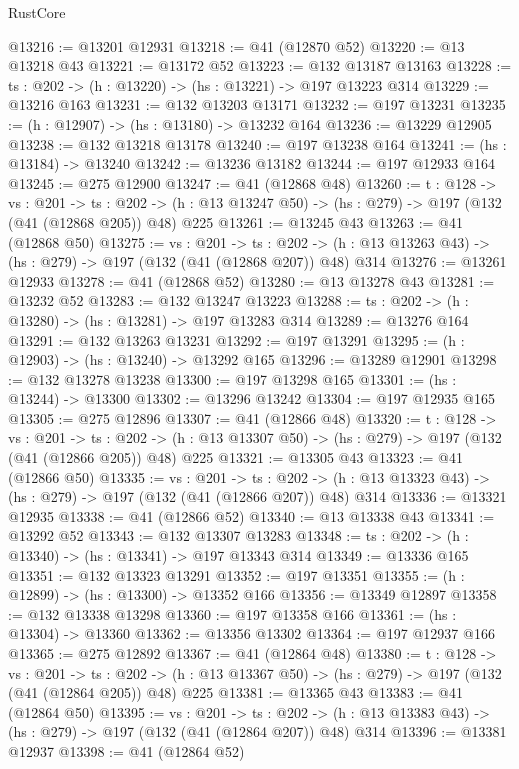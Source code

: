 \begin{lexlean}{RustCore}
\begin{coremodule}
@13216 := @13201 @12931
@13218 := @41 (@12870 @52)
@13220 := @13 @13218 @43
@13221 := @13172 @52
@13223 := @132 @13187 @13163
@13228 := {ts : @202} -> (h : @13220) -> (hs : @13221) -> @197 @13223 @314
@13229 := @13216 @163
@13231 := @132 @13203 @13171
@13232 := @197 @13231
@13235 := (h : @12907) -> (hs : @13180) -> @13232 @164
@13236 := @13229 @12905
@13238 := @132 @13218 @13178
@13240 := @197 @13238 @164
@13241 := (hs : @13184) -> @13240
@13242 := @13236 @13182
@13244 := @197 @12933 @164
@13245 := @275 @12900
@13247 := @41 (@12868 @48)
@13260 := {t : @128} ->
  {vs : @201} ->
  {ts : @202} -> (h : @13 @13247 @50) -> (hs : @279) -> @197 (@132 (@41 (@12868 @205)) @48) @225
@13261 := @13245 @43
@13263 := @41 (@12868 @50)
@13275 := {vs : @201} ->
  {ts : @202} -> (h : @13 @13263 @43) -> (hs : @279) -> @197 (@132 (@41 (@12868 @207)) @48) @314
@13276 := @13261 @12933
@13278 := @41 (@12868 @52)
@13280 := @13 @13278 @43
@13281 := @13232 @52
@13283 := @132 @13247 @13223
@13288 := {ts : @202} -> (h : @13280) -> (hs : @13281) -> @197 @13283 @314
@13289 := @13276 @164
@13291 := @132 @13263 @13231
@13292 := @197 @13291
@13295 := (h : @12903) -> (hs : @13240) -> @13292 @165
@13296 := @13289 @12901
@13298 := @132 @13278 @13238
@13300 := @197 @13298 @165
@13301 := (hs : @13244) -> @13300
@13302 := @13296 @13242
@13304 := @197 @12935 @165
@13305 := @275 @12896
@13307 := @41 (@12866 @48)
@13320 := {t : @128} ->
  {vs : @201} ->
  {ts : @202} -> (h : @13 @13307 @50) -> (hs : @279) -> @197 (@132 (@41 (@12866 @205)) @48) @225
@13321 := @13305 @43
@13323 := @41 (@12866 @50)
@13335 := {vs : @201} ->
  {ts : @202} -> (h : @13 @13323 @43) -> (hs : @279) -> @197 (@132 (@41 (@12866 @207)) @48) @314
@13336 := @13321 @12935
@13338 := @41 (@12866 @52)
@13340 := @13 @13338 @43
@13341 := @13292 @52
@13343 := @132 @13307 @13283
@13348 := {ts : @202} -> (h : @13340) -> (hs : @13341) -> @197 @13343 @314
@13349 := @13336 @165
@13351 := @132 @13323 @13291
@13352 := @197 @13351
@13355 := (h : @12899) -> (hs : @13300) -> @13352 @166
@13356 := @13349 @12897
@13358 := @132 @13338 @13298
@13360 := @197 @13358 @166
@13361 := (hs : @13304) -> @13360
@13362 := @13356 @13302
@13364 := @197 @12937 @166
@13365 := @275 @12892
@13367 := @41 (@12864 @48)
@13380 := {t : @128} ->
  {vs : @201} ->
  {ts : @202} -> (h : @13 @13367 @50) -> (hs : @279) -> @197 (@132 (@41 (@12864 @205)) @48) @225
@13381 := @13365 @43
@13383 := @41 (@12864 @50)
@13395 := {vs : @201} ->
  {ts : @202} -> (h : @13 @13383 @43) -> (hs : @279) -> @197 (@132 (@41 (@12864 @207)) @48) @314
@13396 := @13381 @12937
@13398 := @41 (@12864 @52)

\end{coremodule}
\end{lexlean}
